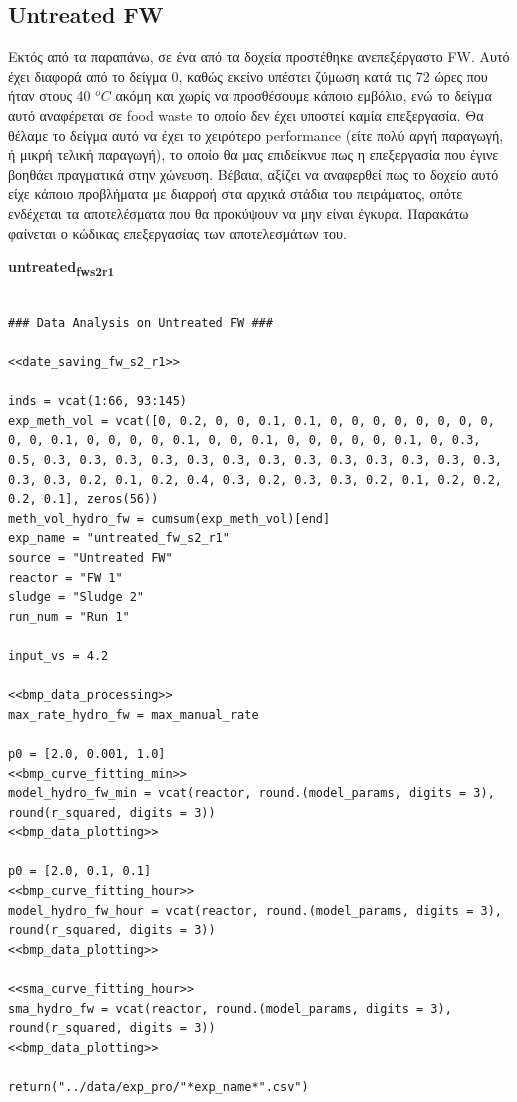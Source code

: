 \documentclass[11pt]{article}
\begin{document}
\subsection{Untreated FW}
\label{sec:orgeecab4f}
Εκτός από τα παραπάνω, σε ένα από τα δοχεία προστέθηκε ανεπεξέργαστο FW. Αυτό έχει διαφορά από το δείγμα 0, καθώς εκείνο υπέστει ζύμωση κατά τις 72 ώρες που ήταν στους 40 \(^oC\) ακόμη και χωρίς να προσθέσουμε κάποιο εμβόλιο, ενώ το δείγμα αυτό αναφέρεται σε food waste το οποίο δεν έχει υποστεί καμία επεξεργασία. Θα θέλαμε το δείγμα αυτό να έχει το χειρότερο performance (είτε πολύ αργή παραγωγή, ή μικρή τελική παραγωγή), το οποίο θα μας επιδείκνυε πως η επεξεργασία που έγινε βοηθάει πραγματικά στην χώνευση. Βέβαια, αξίζει να αναφερθεί πως το δοχείο αυτό είχε κάποιο προβλήματα με διαρροή στα αρχικά στάδια του πειράματος, οπότε ενδέχεται τα αποτελέσματα που θα προκύψουν να μην είναι έγκυρα. Παρακάτω φαίνεται ο κώδικας επεξεργασίας των αποτελεσμάτων του.

\textbf{untreated\textsubscript{fw}\textsubscript{s2}\textsubscript{r1}}
\begin{verbatim}

### Data Analysis on Untreated FW ###

<<date_saving_fw_s2_r1>>

inds = vcat(1:66, 93:145)
exp_meth_vol = vcat([0, 0.2, 0, 0, 0.1, 0.1, 0, 0, 0, 0, 0, 0, 0, 0, 0, 0, 0.1, 0, 0, 0, 0, 0.1, 0, 0, 0.1, 0, 0, 0, 0, 0, 0.1, 0, 0.3, 0.5, 0.3, 0.3, 0.3, 0.3, 0.3, 0.3, 0.3, 0.3, 0.3, 0.3, 0.3, 0.3, 0.3, 0.3, 0.3, 0.2, 0.1, 0.2, 0.4, 0.3, 0.2, 0.3, 0.3, 0.2, 0.1, 0.2, 0.2, 0.2, 0.1], zeros(56))
meth_vol_hydro_fw = cumsum(exp_meth_vol)[end]
exp_name = "untreated_fw_s2_r1"
source = "Untreated FW"
reactor = "FW 1"
sludge = "Sludge 2"
run_num = "Run 1"

input_vs = 4.2

<<bmp_data_processing>>
max_rate_hydro_fw = max_manual_rate

p0 = [2.0, 0.001, 1.0]
<<bmp_curve_fitting_min>>
model_hydro_fw_min = vcat(reactor, round.(model_params, digits = 3), round(r_squared, digits = 3))
<<bmp_data_plotting>>

p0 = [2.0, 0.1, 0.1]
<<bmp_curve_fitting_hour>>
model_hydro_fw_hour = vcat(reactor, round.(model_params, digits = 3), round(r_squared, digits = 3))
<<bmp_data_plotting>>

<<sma_curve_fitting_hour>>
sma_hydro_fw = vcat(reactor, round.(model_params, digits = 3), round(r_squared, digits = 3))
<<bmp_data_plotting>>

return("../data/exp_pro/"*exp_name*".csv")
\end{verbatim}
\end{document}
